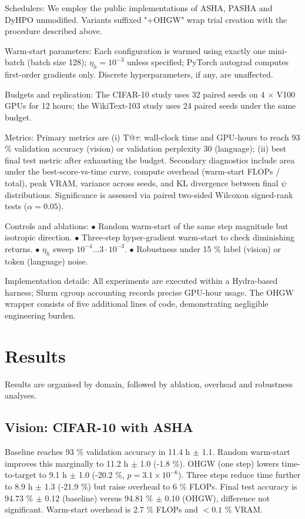 \documentclass{article}
\begin{document}
Schedulers: We employ the public implementations of ASHA, PASHA and DyHPO \cite{bohdal-2022-pasha,wistuba-2022-supervising} unmodified. Variants suffixed "+OHGW" wrap trial creation with the procedure described above.

Warm-start parameters: Each configuration is warmed using exactly one mini-batch (batch size 128); \(\eta_h = 10^{-3}\) unless specified; PyTorch autograd computes first-order gradients only. Discrete hyperparameters, if any, are unaffected.

Budgets and replication: The CIFAR-10 study uses 32 paired seeds on 4 $\times$ V100 GPUs for 12 hours; the WikiText-103 study uses 24 paired seeds under the same budget.

Metrics: Primary metrics are (i) T@$\tau$: wall-clock time and GPU-hours to reach 93 \% validation accuracy (vision) or validation perplexity 30 (language); (ii) best final test metric after exhausting the budget. Secondary diagnostics include area under the best-score-vs-time curve, compute overhead (warm-start FLOPs / total), peak VRAM, variance across seeds, and KL divergence between final \(\psi\) distributions. Significance is assessed via paired two-sided Wilcoxon signed-rank tests (\(\alpha = 0.05\)).

Controls and ablations: \(\bullet\) Random warm-start of the same step magnitude but isotropic direction. \(\bullet\) Three-step hyper-gradient warm-start to check diminishing returns. \(\bullet\) \(\eta_h\) sweep \(10^{-4} \ldots 3\cdot 10^{-3}\). \(\bullet\) Robustness under 15 \% label (vision) or token (language) noise.

Implementation details: All experiments are executed within a Hydra-based harness; Slurm cgroup accounting records precise GPU-hour usage. The OHGW wrapper consists of five additional lines of code, demonstrating negligible engineering burden.

\section{Results}
Results are organised by domain, followed by ablation, overhead and robustness analyses.

\subsection{Vision: CIFAR-10 with ASHA}
Baseline reaches 93 \% validation accuracy in 11.4 h $\pm$ 1.1. Random warm-start improves this marginally to 11.2 h $\pm$ 1.0 (-1.8 \%). OHGW (one step) lowers time-to-target to 9.1 h $\pm$ 1.0 (-20.2 \%, \(p = 3.1 \times 10^{-6}\)). Three steps reduce time further to 8.9 h $\pm$ 1.3 (-21.9 \%) but raise overhead to 6 \% FLOPs. Final test accuracy is 94.73 \% $\pm$ 0.12 (baseline) versus 94.81 \% $\pm$ 0.10 (OHGW), difference not significant. Warm-start overhead is 2.7 \% FLOPs and $<0.1$ \% VRAM.
\end{document}
